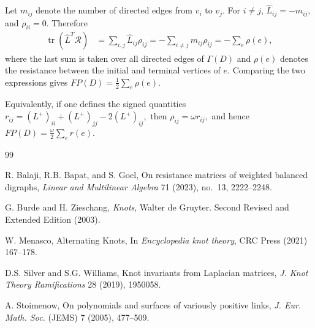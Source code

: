 \documentclass[a4paper,12pt]{amsart}
\numberwithin{equation}{section}
\theoremstyle{plain}
\theoremstyle{definition}
\begin{document}
Let $m_{ij}$ denote the number of directed edges from $v_i$ to
$v_j$. For $i\neq j$,
$
\widehat L_{ij}=-m_{ij},
$
and $\rho_{ii}=0$. Therefore
\begin{align*}
	\operatorname{tr}(\widehat L^T\mathcal R)
	&=
	\sum_{i,j}\widehat L_{ij}\rho_{ij}
	=
	-\sum_{i\neq j}m_{ij}\rho_{ij}
	=
	-\sum_e \rho(e),
\end{align*}
where the last sum is taken over all directed edges of $\Gamma(D)$
and $\rho(e)$ denotes the resistance between the initial and terminal
vertices of $e$. Comparing the two expressions gives
$
	FP(D)=\frac{1}{2}\sum_e \rho(e).
$

Equivalently, if one defines the signed quantities
$
r_{ij}
=
(L^+)_{ii}
+
(L^+)_{jj}
-
2(L^+)_{ij},
$
then
$
\rho_{ij}=\omega r_{ij},
$
and hence
$
FP(D)=\frac{\omega}{2}\sum_e r(e).
$





\begin{thebibliography}{99}
	
	R. Balaji, R.B. Bapat, and S. Goel,
	On resistance matrices of weighted balanced digraphs,
	\emph{Linear and Multilinear Algebra} 71 (2023), no.~13,
	2222--2248.
	
	 G. Burde and H. Zieschang, \emph{Knots}, Walter de Gruyter. Second Revised and Extended Edition (2003).

	 W. Menasco, Alternating Knots, In \emph{Encyclopedia knot theory}, CRC Press (2021) 167--178.
	
	 D.S. Silver and S.G. Williams, Knot invariants from Laplacian matrices, \emph{J. Knot Theory Ramifications} 28 (2019), 1950058.
	
	 A. Stoimenow, On polynomials and surfaces of variously positive links, \emph{J. Eur. Math. Soc.} (JEMS) 7 (2005), 477--509.
	
\end{thebibliography}
\end{document}
